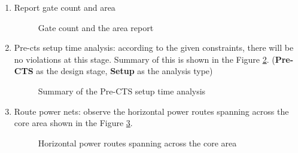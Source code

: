 \documentclass[a4paper,11pt]{article}%
\begin{document}
\begin{enumerate}[1.)]
	\item  Report gate count and area
	\begin{figure}[H]
		\centering
		\caption{Gate count and the area report}
		\label{fig:gateCount}
	\end{figure}
	
	\item Pre-\ac{cts} setup time analysis: according to the given constraints,  there will be no violations at this stage. Summary of this is shown in the Figure \ref{fig:timeDesign}. (\textbf{Pre-CTS} as the design stage,  \textbf{Setup} as the analysis type)
	
	\begin{figure}[H]
		\centering
		\caption{Summary of the Pre-CTS setup time analysis}
		\label{fig:timeDesign}
	\end{figure} 
	
	
	\item Route power nets: observe the horizontal power routes spanning across the core area shown in the Figure \ref{fig:innovus_8_1}.
	\begin{figure}[H]
		\centering
		\caption{Horizontal power routes spanning across the core area}
		\label{fig:innovus_8_1}
	\end{figure}


\end{enumerate}
\end{document}
